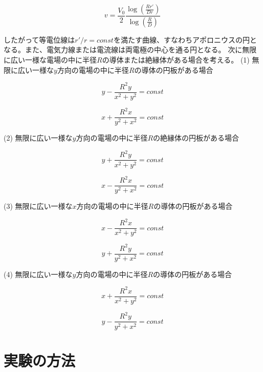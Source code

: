 \documentclass{jsarticle}
\begin{document}
\begin{equation}
\label{4.2}
	v = \frac{V_0}{2}\frac{\log(\frac{Rr'}{Dr})}{\log(\frac{R}{D})}
\end{equation}

したがって等電位線は$r'/r = const$を満たす曲線、すなわちアポロニウスの円となる。また、電気力線または電流線は両電極の中心を通る円となる。
次に無限に広い一様な電場の中に半径$R$の導体または絶縁体がある場合を考える。
(1) 無限に広い一様な$y$方向の電場の中に半径$R$の導体の円板がある場合

\begin{equation}
\label{4.4}
		y - \frac{R^2y}{x^2+y^2} = const
\end{equation}

\begin{equation}
\label{4.5}
		x + \frac{R^2x}{y^2+x^2} = const
\end{equation}

(2) 無限に広い一様な$y$方向の電場の中に半径$R$の絶縁体の円板がある場合

\begin{equation}
\label{4.6}
	y + \frac{R^2y}{x^2+y^2} = const
\end{equation}
	
\begin{equation}
\label{4.7}
	x - \frac{R^2x}{y^2+x^2} = const
\end{equation}

(3) 無限に広い一様な$x$方向の電場の中に半径$R$の導体の円板がある場合

\begin{equation}
\label{4.8}
		x - \frac{R^2x}{x^2+y^2} = const
\end{equation}

\begin{equation}
\label{4.9}
		y + \frac{R^2y}{y^2+x^2} = const
\end{equation}

(4) 無限に広い一様な$y$方向の電場の中に半径$R$の導体の円板がある場合

\begin{equation}
\label{4.10}
		x + \frac{R^2x}{x^2+y^2} = const
\end{equation}

\begin{equation}
\label{4.11}
		y - \frac{R^2y}{y^2+x^2} = const
\end{equation}




\section{実験の方法}
\end{document}
